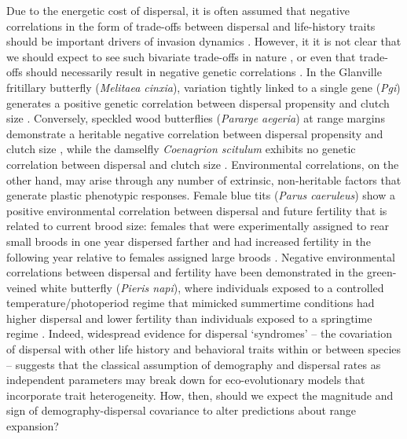 Due to the energetic cost of dispersal, it is often assumed that negative %
correlations in the form of trade-offs between dispersal and life-history traits should be important drivers of invasion dynamics \citep{hanski_dispersal-related_2006,chuang_expanding_2016}. However, it it is not clear that we should expect to see such bivariate trade-offs in nature \citep{saltz_trait_2017}, or even that trade-offs should necessarily result in negative genetic correlations \citep{houle_genetic_1991}. In the Glanville fritillary butterfly (\textit{Melitaea cinxia}), variation tightly linked to a single gene (\textit{Pgi}) generates a positive genetic correlation between dispersal propensity and clutch size \citep{hanski_dispersal-related_2006,bonte_dispersal_2012}. Conversely, speckled wood butterflies (\textit{Pararge aegeria}) at range margins demonstrate a heritable negative correlation between dispersal propensity and clutch size \citep{hughes_evolutionary_2003}, while the damselfly \textit{Coenagrion scitulum} exhibits no genetic correlation between dispersal and clutch size \citep{therry_higher_2014}. Environmental correlations, on the other hand, may arise through any number of extrinsic, non-heritable factors that generate plastic phenotypic responses. Female blue tits (\textit{Parus caeruleus}) show a positive environmental correlation between dispersal and future fertility that is related to current brood size: females that were experimentally assigned to rear small broods in one year dispersed farther and had increased fertility in the following year relative to females assigned large broods \citep{nur_consequences_1988}. Negative environmental correlations between dispersal and fertility have been demonstrated in the green-veined white butterfly (\textit{Pieris napi}), where individuals exposed to a controlled temperature/photoperiod regime that mimicked summertime conditions had higher dispersal and lower fertility than individuals exposed to a springtime regime \citep{karlsson_seasonal_2008}. Indeed, widespread evidence for dispersal `syndromes' -- the covariation of dispersal with other life history and behavioral traits within \citep{clobert2009informed} or between \citep{comte2018evidence} species -- suggests that the classical assumption of demography and dispersal rates as independent parameters may break down for eco-evolutionary models that incorporate trait heterogeneity. How, then, should we expect the magnitude and sign of demography-dispersal covariance to alter predictions about range expansion?

